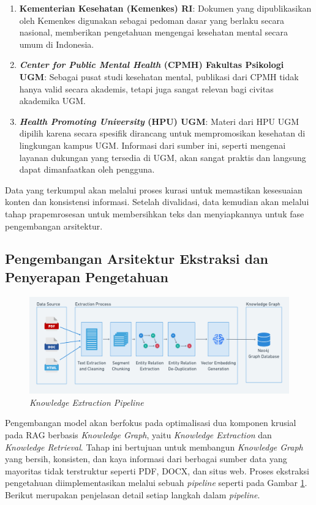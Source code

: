 \begin{enumerate}
	\item \textbf{Kementerian Kesehatan (Kemenkes) RI}: Dokumen yang dipublikasikan oleh Kemenkes digunakan sebagai pedoman dasar yang berlaku secara nasional, memberikan pengetahuan mengengai kesehatan mental secara umum di Indonesia.
	\item \textbf{\textit{Center for Public Mental Health} (CPMH) Fakultas Psikologi UGM}: Sebagai pusat studi kesehatan mental, publikasi dari CPMH tidak hanya valid secara akademis, tetapi juga sangat relevan bagi civitas akademika UGM.
	\item \textbf{\textit{Health Promoting University} (HPU) UGM}: Materi dari HPU UGM dipilih karena secara spesifik dirancang untuk mempromosikan kesehatan di lingkungan kampus UGM. Informasi dari sumber ini, seperti mengenai layanan dukungan yang tersedia di UGM, akan sangat praktis dan langsung dapat dimanfaatkan oleh pengguna.
\end{enumerate}

Data yang terkumpul akan melalui proses kurasi untuk memastikan kesesuaian konten dan konsistensi informasi.
Setelah divalidasi, data kemudian akan melalui tahap prapemrosesan untuk membersihkan teks dan menyiapkannya untuk fase pengembangan arsitektur.

\subsection{Pengembangan Arsitektur Ekstraksi dan Penyerapan Pengetahuan}

\begin{figure}[H]
	\centering
	\includegraphics[width=1\textwidth]{images/knowledge-extraction-flow.png}
	\caption{
		\textit{Knowledge Extraction Pipeline}
	}
	\label{fig:knowledge-extraction-pipeline}
\end{figure}

Pengembangan model akan berfokus pada optimalisasi dua komponen krusial pada RAG berbasis \textit{Knowledge Graph}, yaitu \textit{Knowledge Extraction} dan \textit{Knowledge Retrieval}.
Tahap ini bertujuan untuk membangun \textit{Knowledge Graph} yang bersih, konsisten, dan kaya informasi dari berbagai sumber data yang mayoritas tidak terstruktur seperti PDF, DOCX, dan situs web.
Proses ekstraksi pengetahuan diimplementasikan melalui sebuah \textit{pipeline} seperti pada Gambar \ref{fig:knowledge-extraction-pipeline}.
Berikut merupakan penjelasan detail setiap langkah dalam \textit{pipeline}.

